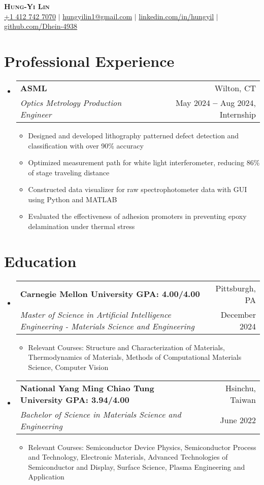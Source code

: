 \documentclass[a4paper,11pt]{article}
\makeatletter
\newcommand{\resumeItem}[1]{
  \item\small{
    {#1 \vspace{-2pt}}
  }
}
\newcommand{\resumeDoubleHeading}[4]{
  \vspace{-2pt}\item
    \begin{tabular*}{0.97\textwidth}[t]{l@{\extracolsep{\fill}}r}
        \textbf{#1} & #2 \\
        \textit{\small#3} & {\small #4} \\
    \end{tabular*}\vspace{-5pt}
}
\newcommand{\resumeSubHeadingListStart}{\begin{itemize}[leftmargin=0.15in, label={}]}
\newcommand{\resumeSubHeadingListEnd}{\end{itemize}}
\newcommand{\resumeItemListStart}{\begin{itemize}}
\newcommand{\resumeItemListEnd}{\end{itemize}\vspace{-5pt}}
\makeatother
\begin{document}

\begin{center}
    \textbf{\Huge \scshape Hung-Yi Lin} \\ \vspace{3pt}
    \small
    \faMobile \hspace{.5pt} \href{tel:14127427070}{+1 412 742 7070}
    $|$
    \faAt \hspace{.5pt} \href{mailto:hungyilin1@gmail.com}{hungyilin1@gmail.com}
    $|$
    \faLinkedinSquare \hspace{.5pt} \href{https://www.linkedin.com/in/hungyil}{linkedin.com/in/hungyil}
    $|$
    \faGithub \hspace{.5pt} \href{https://github.com/Dhein-4938}{github.com/Dhein-4938}
\end{center}


\section{Professional Experience}
  \vspace{3pt}
  \resumeSubHeadingListStart
    \resumeDoubleHeading
      {ASML}{Wilton, CT}
      {Optics Metrology Production Engineer}{May 2024 \textbf{--} Aug 2024, Internship}
        \resumeItemListStart
            \resumeItem{Designed and developed lithography patterned defect detection and classification with over 90\% accuracy}
            \resumeItem{Optimized measurement path for white light interferometer, reducing 86\% of stage traveling distance}
            \resumeItem{Constructed data visualizer for raw spectrophotometer data with GUI using Python and MATLAB}
            \resumeItem{Evaluated the effectiveness of adhesion promoters in preventing epoxy delamination under thermal stress}
        \resumeItemListEnd
  \resumeSubHeadingListEnd


\section{Education}
\vspace{3pt}
\resumeSubHeadingListStart
    \resumeDoubleHeading
      {Carnegie Mellon University \textnormal{\small GPA: 4.00/4.00}}{Pittsburgh, PA}
      {Master of Science in Artificial Intelligence Engineering - Materials Science and Engineering}{December 2024}
    \resumeSubHeadingListStart
        \resumeItem{Relevant Courses: Structure and Characterization of Materials, Thermodynamics of Materials, Methods of Computational Materials Science, Computer Vision}
    \resumeSubHeadingListEnd
    \resumeDoubleHeading
      {National Yang Ming Chiao Tung University  \textnormal{\small GPA: 3.94/4.00}}{Hsinchu, Taiwan}
      {Bachelor of Science in Materials Science and Engineering}{June 2022}
    \resumeSubHeadingListStart
        \resumeItem{Relevant Courses: Semiconductor Device Physics, Semiconductor Process and Technology, Electronic Materials, Advanced Technologies of Semiconductor and Display, Surface Science, Plasma Engineering and Application}
    \resumeSubHeadingListEnd   
\resumeSubHeadingListEnd
\end{document}
